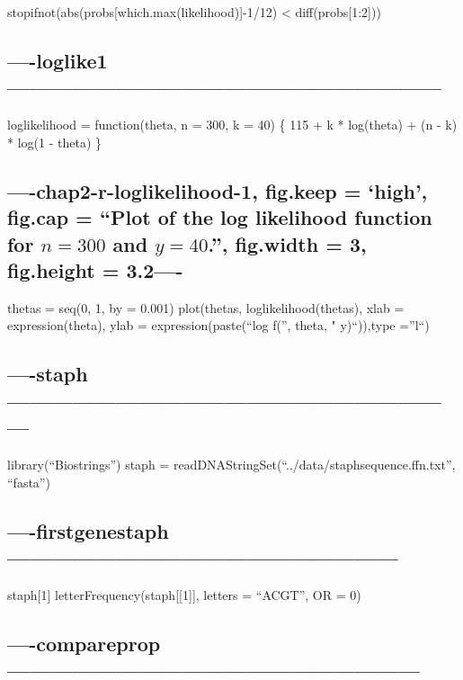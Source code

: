 \documentclass[]{article}
\begin{document}
stopifnot(abs(probs{[}which.max(likelihood){]}-1/12) \textless{}
diff(probs{[}1:2{]}))

\subsection{----loglike1------------------------------------------------------------}\label{loglike1}

loglikelihood = function(theta, n = 300, k = 40) \{ 115 + k * log(theta)
+ (n - k) * log(1 - theta) \}

\subsection{\texorpdfstring{----chap2-r-loglikelihood-1, fig.keep =
`high', fig.cap = ``Plot of the log likelihood function for \(n=300\)
and \(y=40\).'', fig.width = 3, fig.height =
3.2----}{----chap2-r-loglikelihood-1, fig.keep = high, fig.cap = Plot of the log likelihood function for n=300 and y=40., fig.width = 3, fig.height = 3.2----}}\label{chap2-r-loglikelihood-1-fig.keep-high-fig.cap-plot-of-the-log-likelihood-function-for-n300-and-y40.-fig.width-3-fig.height-3.2-}

thetas = seq(0, 1, by = 0.001) plot(thetas, loglikelihood(thetas), xlab
= expression(theta), ylab = expression(paste(``log f('', theta, "
\textbar{} y)``)),type =''l``)

\subsection{----staph---------------------------------------------------------------}\label{staph}

library(``Biostrings'') staph =
readDNAStringSet(``../data/staphsequence.ffn.txt'', ``fasta'')

\subsection{----firstgenestaph------------------------------------------------------}\label{firstgenestaph}

staph{[}1{]} letterFrequency(staph{[}{[}1{]}{]}, letters = ``ACGT'', OR
= 0)

\subsection{----compareprop---------------------------------------------------------}\label{compareprop}
\end{document}
